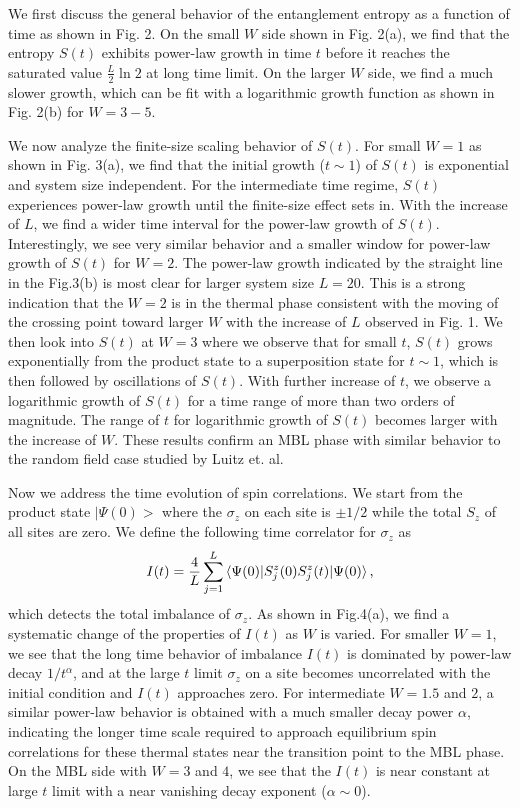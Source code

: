 \documentclass[prl,aps,epsf,showpacs,twocolumn,letterpaper]{revtex4}
\begin{document}
We first discuss the general behavior of the entanglement entropy as a function of time as shown in Fig. 2.  On the small $W$ side shown in Fig. 2(a), we find that the entropy $S(t)$ exhibits power-law growth in time $t$ before it reaches the saturated value $\frac L 2 \ln2$ at long time limit.  On the larger $W$ side, we find a much slower growth, which can be fit with a logarithmic growth function as shown in Fig. 2(b) for $W=3-5$.  

We now analyze the finite-size scaling behavior of $S(t)$.  For small $W=1$ as shown in Fig. 3(a), we find that the initial growth ($t\sim 1$) of $S(t)$ is exponential and system size independent.  For the intermediate time regime, $S(t)$ experiences power-law growth until the finite-size effect sets in.  With the increase of $L$, we find a wider time interval for the power-law growth of $S(t)$.  Interestingly, we see very similar behavior and a smaller window for power-law growth of $S(t)$ for $W=2$.  The power-law growth indicated by the straight line in the Fig.3(b) is most clear for larger system size $L=20$.  This is a strong indication that the $W=2$  is in the thermal phase consistent with the moving of the crossing point toward larger $W$ with the increase of $L$ observed in Fig. 1.  We then look into $S(t)$ at $W=3$ where we observe that for small $t$, $S(t)$ grows exponentially from the product state to a superposition state for $t\sim 1$, which is then followed by oscillations of $S(t)$.  With further increase of $t$, we observe a logarithmic growth of $S(t)$ for a time range of more than two orders of magnitude.  The range of $t$ for logarithmic growth of $S(t)$ becomes larger with the increase of $W$.  These results confirm an MBL phase with similar behavior to the random field case studied by Luitz et. al\cite{luitz2015}. 

Now we address the time evolution of spin correlations.  We start from the product state $|\Psi(0)>$ where the $\sigma_z$ on each site is $\pm 1/2$ while the total $S_z$ of all sites are zero.  We define the following time correlator for $\sigma_z$ as 
\begin{equation}
I(t)=\frac{4}{L} \sum_{j=1}^L \braket{\Psi(0)|S_j^z(0)S_j^z(t)|\Psi(0)} \text{,} \label{eq:imb}
\end{equation}
which detects the total imbalance of $\sigma_z$.  As shown in Fig.4(a), we find a systematic change of the properties of $I(t)$ as $W$ is varied.  For smaller $W=1$, we see that the long time behavior of imbalance $I(t)$ is dominated by  power-law decay $1/t^{\alpha}$, and at the large $t$ limit $\sigma_z$ on a site becomes uncorrelated with the initial condition and $I(t)$ approaches zero.  For intermediate $W=1.5$ and $2$, a similar power-law behavior is obtained with a much smaller decay power $\alpha$, indicating the longer time scale required to approach equilibrium spin correlations for these thermal states near the transition point to the MBL phase.  On the MBL side with $W=3$ and $4$, we see that the $I(t)$ is near constant at large $t$ limit with a near vanishing decay exponent ($\alpha \sim 0$).
\end{document}
